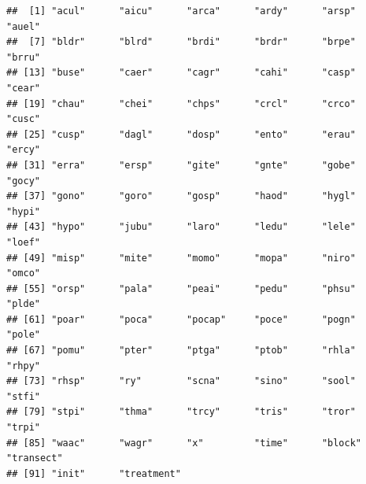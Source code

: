 \documentclass[
]{article}
\begin{document}
\begin{verbatim}
##  [1] "acul"      "aicu"      "arca"      "ardy"      "arsp"      "auel"     
##  [7] "bldr"      "blrd"      "brdi"      "brdr"      "brpe"      "brru"     
## [13] "buse"      "caer"      "cagr"      "cahi"      "casp"      "cear"     
## [19] "chau"      "chei"      "chps"      "crcl"      "crco"      "cusc"     
## [25] "cusp"      "dagl"      "dosp"      "ento"      "erau"      "ercy"     
## [31] "erra"      "ersp"      "gite"      "gnte"      "gobe"      "gocy"     
## [37] "gono"      "goro"      "gosp"      "haod"      "hygl"      "hypi"     
## [43] "hypo"      "jubu"      "laro"      "ledu"      "lele"      "loef"     
## [49] "misp"      "mite"      "momo"      "mopa"      "niro"      "omco"     
## [55] "orsp"      "pala"      "peai"      "pedu"      "phsu"      "plde"     
## [61] "poar"      "poca"      "pocap"     "poce"      "pogn"      "pole"     
## [67] "pomu"      "pter"      "ptga"      "ptob"      "rhla"      "rhpy"     
## [73] "rhsp"      "ry"        "scna"      "sino"      "sool"      "stfi"     
## [79] "stpi"      "thma"      "trcy"      "tris"      "tror"      "trpi"     
## [85] "waac"      "wagr"      "x"         "time"      "block"     "transect" 
## [91] "init"      "treatment"
\end{verbatim}
\end{document}

